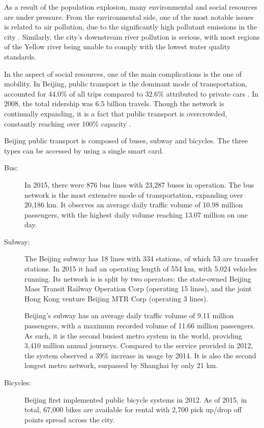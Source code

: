 \documentclass{article}
\begin{document}
As a result of the population explosion, many environmental and social resources are under pressure. From the environmental side, one of the most notable issues is related to air pollution, due to the significantly high pollutant emissions in the city \cite{zhang2016air}. Similarly, the city's downstream river pollution is serious, with most regions of the Yellow river being unable to comply with the lowest water quality standards. \cite{wang2015studies} 

In the aspect of social resources, one of the main complications is the one of mobility. In Beijing, public transport is the dominant mode of transportation, accounted for 44.0\% of all trips compared to 32.6\% attributed to private cars \cite{mao2016commuting}. In 2008, the total ridership was 6.5 billion travels. Though the network is continually expanding, it is a fact that public transport is overcrowded, constantly reaching over 100\% capacity \cite{beijing2009research}.

Beijing public transport is composed of buses, subway and bicycles. The three types can be accessed by using a single smart card. 

\begin{description}
\item[Bus:] In 2015, there were 876 bus lines with 23,287 buses in operation. The bus network is the most extensive mode of transportation, expanding over 20,186 km. It observes an average daily traffic volume of 10.98 million passengers, with the highest daily volume reaching 13.07 million on one day. \cite{beijing2016annual}

\item[Subway:] The Beijing subway has 18 lines with 334 stations, of which 53 are transfer stations. In 2015 it had an operating length of 554 km, with 5,024 vehicles running. \cite{beijing2016annual} Its network is is split by two operators: the state-owned Beijing Mass Transit Railway Operation Corp (operating 15 lines), and the joint Hong Kong venture Beijing MTR Corp (operating 3 lines).

Beijing's subway has an average daily traffic volume of 9.11 million passengers, with a maximum recorded volume of 11.66 million passengers. As such, it is the second busiest metro system in the world, providing 3,410 million annual journeys. Compared to the service provided in 2012, the system observed a 39\% increase in usage by 2014. It is also the second longest metro network, surpassed by Shanghai by only 21 km.  \cite{uitp2015world} 

\item[Bicycles:] Beijing first implemented public bicycle systems in 2012. As of 2015, in total, 67,000 bikes are available for rental with 2,700 pick up/drop off points spread across the city. \cite{beijing2016annual}
\end{description}
\end{document}
